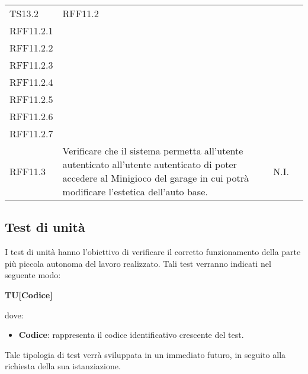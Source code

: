 \begin{longtable}{ >{\centering}p{} >{\centering}p{} >{\centering}p{}
			 >{\centering}p{}}
		TS13.2	& RFF11.2\\ RFF11.2.1 \\ RFF11.2.2 \\ RFF11.2.3 \\ RFF11.2.4 \\ RFF11.2.5  \\ RFF11.2.6 \\ RFF11.2.7 \\RFF11.3 & Verificare che il sistema permetta all'utente autenticato all'utente autenticato di poter accedere al Minigioco del garage in cui potrà modificare l'estetica dell'auto base. 	& N.I.		\tabularnewline
\end{longtable}

\newpage		
\subsection{Test di unità}
I test di unità hanno l'obiettivo di verificare il corretto funzionamento della parte più piccola autonoma del lavoro realizzato. Tali test verranno indicati nel seguente modo:\\
	\centerline{\textbf{TU[Codice]}}
dove:
\begin{itemize}
	\item \textbf{Codice}: rappresenta il codice identificativo crescente del test.
\end{itemize}
Tale tipologia di test verrà sviluppata in un immediato futuro, in seguito alla richiesta della sua istanziazione.


\renewcommand{\arraystretch}{1.5}
	
